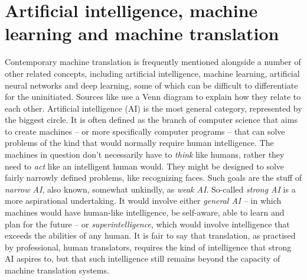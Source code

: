 \documentclass[output=paper]{langscibook}
\begin{document}
\section{Artificial intelligence, machine learning and machine translation}
Contemporary machine translation is frequently mentioned alongside a number of other related concepts, including artificial intelligence, machine learning, artificial neural networks and deep learning, some of which can be difficult to differentiate for the uninitiated. Sources like \cite{deeplearningbook} use a Venn diagram to explain how they relate to each other. Artificial intelligence (AI) is the most general category, represented by the biggest circle. It is often defined as the branch of computer science that aims to create machines -- or more specifically computer programs -- that can solve problems of the kind that would normally require human intelligence. The machines in question don't necessarily have to \textit{think} like humans, rather they need to \textit{act} like an intelligent human would. They might be designed to solve fairly narrowly defined problems, like recognizing faces. Such goals are the stuff of \textit{narrow AI}, also known, somewhat unkindly, as \textit{weak AI}. So-called \textit{strong AI} is a more aspirational undertaking. It would involve either \textit{general AI} -- in which machines would have human-like intelligence, be self-aware, able to learn and plan for the future -- or \textit{superintelligence}, which would involve intelligence that exceeds the abilities of any human. It is fair to say that translation, as practised by professional, human translators, requires the kind of intelligence that strong AI aspires to, but that such intelligence still remains beyond the capacity of machine translation systems.  
\end{document}
